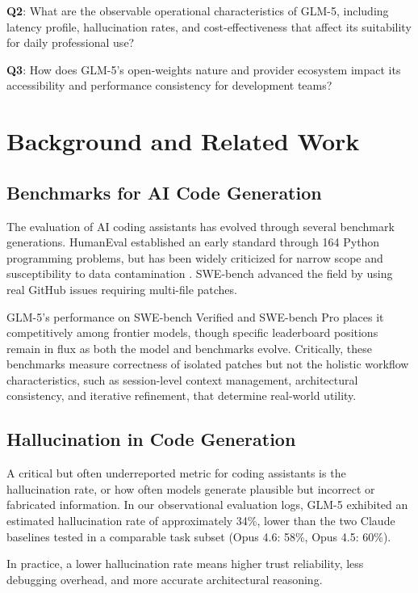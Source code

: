 \documentclass[conference]{IEEEtran}
\begin{document}
\textbf{Q2}: What are the observable operational characteristics of GLM-5, including latency profile, hallucination rates, and cost-effectiveness that affect its suitability for daily professional use?

\textbf{Q3}: How does GLM-5's open-weights nature and provider ecosystem impact its accessibility and performance consistency for development teams?

\section{Background and Related Work}

\subsection{Benchmarks for AI Code Generation}
The evaluation of AI coding assistants has evolved through several benchmark generations. HumanEval \cite{chen2021evaluating} established an early standard through 164 Python programming problems, but has been widely criticized for narrow scope and susceptibility to data contamination \cite{fryer2024hallucination}. SWE-bench \cite{jimenez2024swebench} advanced the field by using real GitHub issues requiring multi-file patches.

GLM-5's performance on SWE-bench Verified and SWE-bench Pro places it competitively among frontier models, though specific leaderboard positions remain in flux as both the model and benchmarks evolve. Critically, these benchmarks measure correctness of isolated patches but not the holistic workflow characteristics, such as session-level context management, architectural consistency, and iterative refinement, that determine real-world utility.

\subsection{Hallucination in Code Generation}
A critical but often underreported metric for coding assistants is the hallucination rate, or how often models generate plausible but incorrect or fabricated information. In our observational evaluation logs, GLM-5 exhibited an estimated hallucination rate of approximately 34\%, lower than the two Claude baselines tested in a comparable task subset (Opus 4.6: 58\%, Opus 4.5: 60\%).

In practice, a lower hallucination rate means higher trust reliability, less debugging overhead, and more accurate architectural reasoning.
\end{document}
